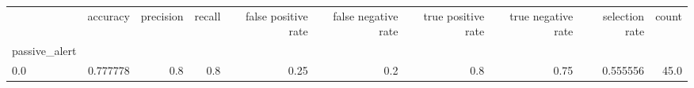 \begin{tabular}{lrrrrrrrrr}
\toprule
{} &  accuracy &  precision &  recall &  false positive rate &  false negative rate &  true positive rate &  true negative rate &  selection rate &  count \\
passive\_alert &           &            &         &                      &                      &                     &                     &                 &        \\
\midrule
0.0           &  0.777778 &        0.8 &     0.8 &                 0.25 &                  0.2 &                 0.8 &                0.75 &        0.555556 &   45.0 \\
\bottomrule
\end{tabular}
